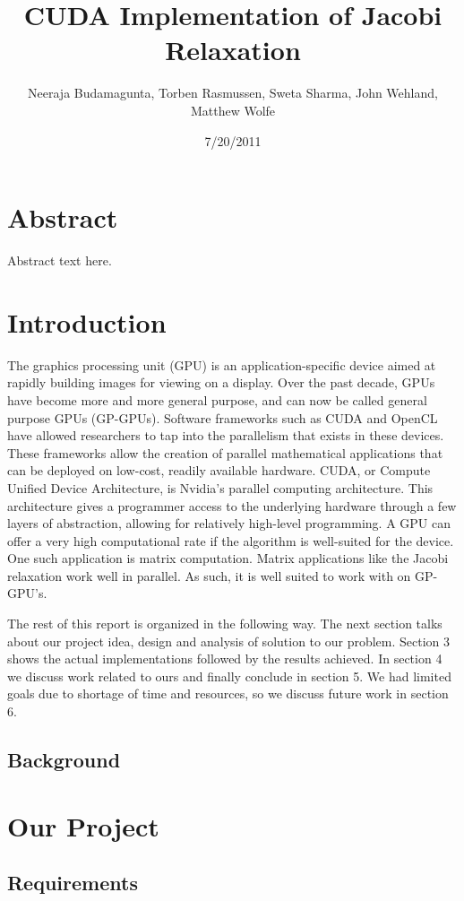 \documentclass[10pt, twocolumn]{article}
\title{CUDA Implementation of Jacobi Relaxation}
\author{Neeraja Budamagunta, Torben Rasmussen, Sweta Sharma, John Wehland, Matthew Wolfe}
\date{7/20/2011}
\begin{document}
\maketitle
\section{Abstract}
Abstract text here.
\section{Introduction} %
The graphics processing unit (GPU) is an application-specific device aimed at rapidly building images for viewing on a display.
Over the past decade, GPUs have become more and more general purpose, and can now be called general purpose GPUs (GP-GPUs).
Software frameworks such as CUDA and OpenCL have allowed researchers to tap into the parallelism that exists in these devices.
These frameworks allow the creation of parallel mathematical applications that can be deployed on low-cost, readily available hardware.
CUDA, or Compute Unified Device Architecture, is Nvidia's parallel computing architecture.
This architecture gives a programmer access to the underlying hardware through a few layers of abstraction, allowing for relatively high-level programming.
A GPU can offer a very high computational rate if the algorithm is well-suited for the device.
One such application is matrix computation.
Matrix applications like the Jacobi relaxation work well in parallel.
As such, it is well suited to work with on GP-GPU’s.

The rest of this report is organized in the following way.
The next section talks about our project idea, design and analysis of solution to our problem.
Section 3 shows the actual implementations followed by the results achieved.
In section 4 we discuss work related to ours and finally conclude in section 5.
We had limited goals due to shortage of time and resources, so we discuss future work in section 6.

    \subsection{Background} %

\section{Our Project}
    \subsection{Requirements} %
\end{document}
